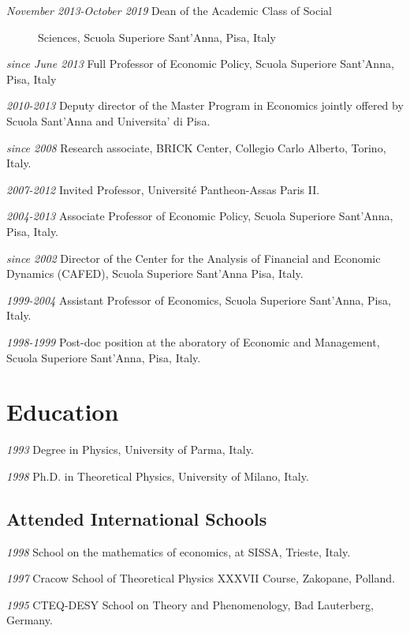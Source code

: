 \documentclass[a4paper]{article}
\begin{document}
\begin{description}
\item[{\emph{November 2013-October 2019} Dean of the Academic Class of Social}] 
Sciences, Scuola Superiore Sant'Anna, Pisa, Italy

\end{description}

\emph{since June 2013} Full Professor of Economic Policy, Scuola Superiore
Sant'Anna, Pisa, Italy

\emph{2010-2013} Deputy director of the Master Program in Economics
jointly offered by Scuola Sant'Anna and Universita' di Pisa.

\emph{since 2008} Research associate, BRICK Center, Collegio Carlo Alberto,
Torino, Italy.

\emph{2007-2012} Invited Professor, Université Pantheon-Assas Paris II.

\emph{2004-2013} Associate Professor of Economic Policy, Scuola Superiore
Sant'Anna, Pisa, Italy.

\emph{since 2002} Director of the Center for the Analysis of Financial and
Economic Dynamics (CAFED), Scuola Superiore Sant'Anna Pisa, Italy.

\emph{1999-2004} Assistant Professor of Economics, Scuola Superiore
Sant'Anna, Pisa, Italy.

\emph{1998-1999} Post-doc position at the aboratory of Economic and
Management, Scuola Superiore Sant'Anna, Pisa, Italy.


\section{Education%
  \label{education}%
}

\emph{1993} Degree in Physics, University of Parma, Italy.

\emph{1998} Ph.D. in Theoretical Physics, University of Milano, Italy.


\subsection{Attended International Schools%
  \label{attended-international-schools}%
}

\emph{1998} School on the mathematics of economics, at SISSA, Trieste, Italy.

\emph{1997} Cracow School of Theoretical Physics XXXVII Course, Zakopane,
Polland.

\emph{1995} CTEQ-DESY School on Theory and Phenomenology, Bad Lauterberg,
Germany.
\end{document}
